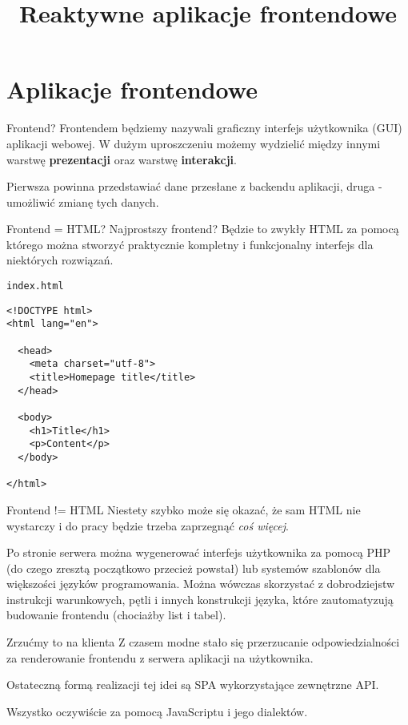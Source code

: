 

\title{Reaktywne aplikacje frontendowe}



\section{Aplikacje frontendowe}

\begin{frame}{Frontend?}
	Frontendem będziemy nazywali graficzny interfejs użytkownika (GUI) aplikacji webowej. W dużym uproszczeniu możemy wydzielić między innymi warstwę \textbf{prezentacji} oraz warstwę \textbf{interakcji}.
	
	Pierwsza powinna przedstawiać dane przesłane z backendu aplikacji, druga - umożliwić zmianę tych danych.
\end{frame}

\begin{frame}{Frontend = HTML?}
	Najprostszy frontend? Będzie to zwykły HTML za pomocą którego można stworzyć praktycznie kompletny i funkcjonalny interfejs dla niektórych rozwiązań.
\end{frame}

\begin{frame}[fragile]{\texttt{index.html}}
	\begin{lstlisting}
<!DOCTYPE html>
<html lang="en">

  <head>
    <meta charset="utf-8">
    <title>Homepage title</title>
  </head>

  <body>
    <h1>Title</h1>
    <p>Content</p>
  </body>

</html>
	\end{lstlisting}
\end{frame}

\begin{frame}{Frontend != HTML}
	Niestety szybko może się okazać, że sam HTML nie wystarczy i do pracy będzie trzeba zaprzegnąć \emph{coś więcej}.
	
	Po stronie serwera można wygenerować interfejs użytkownika za pomocą PHP (do czego zresztą początkowo przecież powstał) lub systemów szablonów dla większości języków programowania. Można wówczas skorzystać z dobrodziejstw instrukcji warunkowych, pętli i innych konstrukcji języka, które zautomatyzują budowanie frontendu (chociażby list i tabel).
\end{frame}

\begin{frame}{Zrzućmy to na klienta}
	Z czasem modne stało się przerzucanie odpowiedzialności za renderowanie frontendu z serwera aplikacji na użytkownika.
	
	Ostateczną formą realizacji tej idei są SPA wykorzystające zewnętrzne API.
	
	Wszystko oczywiście za pomocą JavaScriptu i jego dialektów.
\end{frame}

